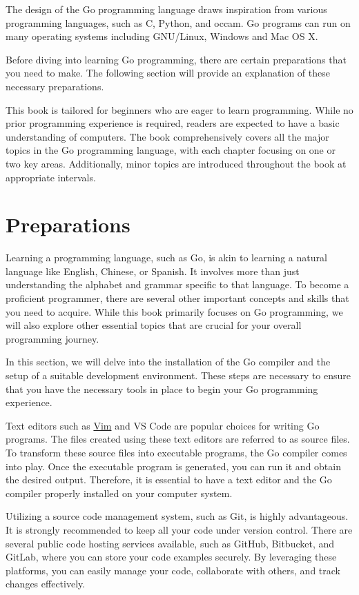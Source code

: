 The design of the Go programming language draws inspiration from various
programming languages, such as C, Python, and occam. Go programs can run on many
operating systems including GNU/Linux, Windows and Mac OS X.

Before diving into learning Go programming, there are certain preparations that
you need to make. The following section will provide an explanation of these
necessary preparations.

This book is tailored for beginners who are eager to learn programming. While no
prior programming experience is required, readers are expected to have a basic
understanding of computers. The book comprehensively covers all the major topics
in the Go programming language, with each chapter focusing on one or two key
areas. Additionally, minor topics are introduced throughout the book at
appropriate intervals.

\section{Preparations}

Learning a programming language, such as Go, is akin to learning a natural
language like English, Chinese, or Spanish. It involves more than just
understanding the alphabet and grammar specific to that language. To become a
proficient programmer, there are several other important concepts and skills
that you need to acquire. While this book primarily focuses on Go programming,
we will also explore other essential topics that are crucial for your overall
programming journey.

In this section, we will delve into the installation of the Go compiler and the
setup of a suitable development environment. These steps are necessary to ensure
that you have the necessary tools in place to begin your Go programming
experience.

Text editors such as \href{https://vim-bootstrap.com}{Vim} and VS Code are
popular choices for writing Go programs. The files created using these text
editors are referred to as source files. To transform these source files into
executable programs, the Go compiler comes into play. Once the executable
program is generated, you can run it and obtain the desired output. Therefore,
it is essential to have a text editor and the Go compiler properly installed on
your computer system.

Utilizing a source code management system, such as Git, is highly advantageous.
It is strongly recommended to keep all your code under version control. There
are several public code hosting services available, such as GitHub, Bitbucket,
and GitLab, where you can store your code examples securely. By leveraging these
platforms, you can easily manage your code, collaborate with others, and track
changes effectively.


